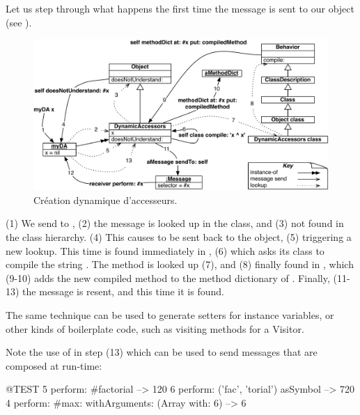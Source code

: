 \documentclass[a4paper,10pt,twoside]{book}
\begin{document}
Let us step through what happens the first time the message  is sent to our object (see ).

\begin{figure}[ht]\centering
	\includegraphics[width=\linewidth]{DynamicAccessors}
	\caption{Création dynamique d'accesseurs.}
\end{figure}

(1) We send  to , (2) the message is looked up in the class, and (3) not found in the class hierarchy. (4) This causes  to be sent back to the object, (5) triggering a new lookup. This time  is found immediately in , (6) which asks its class to compile the string . The  method is looked up (7), and (8) finally found in , which (9-10) adds the new compiled method to the method dictionary of . Finally, (11-13) the message is resent, and this time it is found.

The same technique can be used to generate setters for instance variables, or other kinds of boilerplate code, such as visiting methods for a Visitor.

Note the use of  in step (13) which can be used to send messages that are composed at run-time:
\begin{code}{@TEST}
5 perform: #factorial                                             --> 120
6 perform: ('fac', 'torial') asSymbol                       --> 720
4 perform: #max: withArguments: (Array with: 6) --> 6
\end{code}
\end{document}
